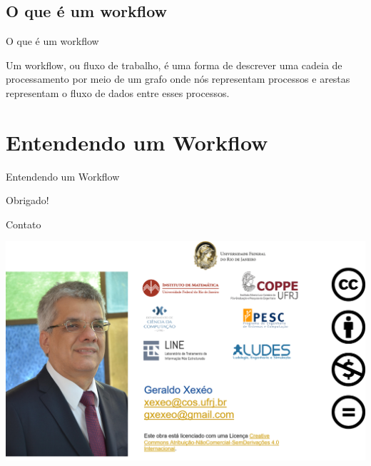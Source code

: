 \documentclass{beamer}
\begin{document}
\subsection{O que é um workflow}
\begin{frame}{O que é um workflow}
\begin{outline}
Um workflow, ou fluxo de trabalho, é uma forma de descrever uma cadeia de processamento por meio de um grafo onde nós representam processos e arestas representam o fluxo de dados entre esses processos.
\vfill

\end{outline}
\end{frame}


\section{Entendendo um Workflow}


\begin{frame}{Entendendo um Workflow}

\end{frame} 


\begin{frame}
\Huge \center
Obrigado!
\end{frame} 

\begin{frame}{Contato}
\begin{center}
    \includegraphics[width=\linewidth]{Images/Picture5.png}
\end{center}   
\end{frame}
\end{document}
